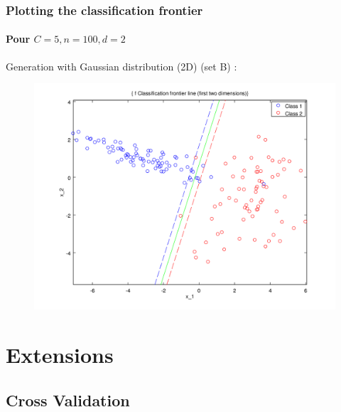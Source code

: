 \documentclass{beamer}
\begin{document}
\begin{frame}
\frametitle{Plotting the \textbf{classification frontier}}
\framesubtitle{Pour $C = 5, n = 100, d = 2$}

Generation with Gaussian distribution (2D) (set B) :

         \begin{figure}
         \centering
         \includegraphics[scale=0.4]{images/image2.png}
         \end{figure}

\end{frame}

\section{Extensions}

\subsection{Cross Validation}

\begin{frame}
\tableofcontents[currentsubsection]
\end{frame}
\end{document}
